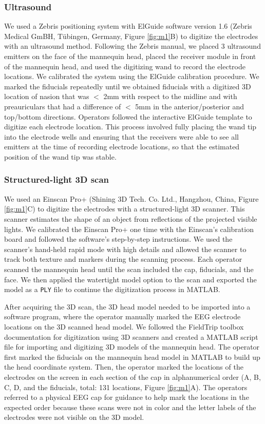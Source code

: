 \documentclass[../thesis_seyed.tex]{subfiles}
\begin{document}
\subsubsection{Ultrasound}
We used a Zebris positioning system with ElGuide software version 1.6 (Zebris Medical GmBH, T\"ubingen, Germany, Figure \ref{fig:m1}B) to digitize the electrodes with an ultrasound method. Following the Zebris manual, we placed 3 ultrasound emitters on the face of the mannequin head, placed the receiver module in front of the mannequin head, and used the digitizing wand to record the electrode locations. We calibrated the system using the ElGuide calibration procedure. We marked the fiducials repeatedly until we obtained fiducials with a digitized 3D location of nasion that was $<$ 2mm with respect to the midline and with preauriculars that had a difference of $<$ 5mm in the anterior/posterior and top/bottom directions. Operators followed the interactive ElGuide template to digitize each electrode location. This process involved fully placing the wand tip into the electrode wells and ensuring that the receivers were able to see all emitters at the time of recording electrode locations, so that the estimated position of the wand tip was stable. 

\subsubsection{Structured-light 3D scan}
We used an Einscan Pro+ (Shining 3D Tech. Co. Ltd., Hangzhou, China, Figure \ref{fig:m1}C) to digitize the electrodes with a structured-light 3D scanner. This scanner estimates the shape of an object from reflections of the projected visible lights. We calibrated the Einscan Pro+ one time with the Einscan's calibration board and followed the software's step-by-step instructions. We used the scanner's hand-held rapid mode with high details and allowed the scanner to track both texture and markers during the scanning process. Each operator scanned the mannequin head until the scan included the cap, fiducials, and the face. We then applied the watertight model option to the scan and exported the model as a {\tt PLY} file to continue the digitization process in MATLAB.

After acquiring the 3D scan, the 3D head model needed to be imported into a software program, where the operator manually marked the EEG electrode locations on the 3D scanned head model. We followed the FieldTrip toolbox documentation for digitization using 3D scanners \cite{ft_scan_tut} and created a MATLAB script file for importing and digitizing 3D models of the mannequin head. The operator first marked the fiducials on the mannequin head model in MATLAB to build up the head coordinate system. Then, the operator marked the locations of the electrodes on the screen in each section of the cap in alphanumerical order (A, B, C, D, and the fiducials, total: 131 locations, Figure \ref{fig:m1}A). The operators referred to a physical EEG cap for guidance to help mark the locations in the expected order because these scans were not in color and the letter labels of the electrodes were not visible on the 3D model.
\end{document}
